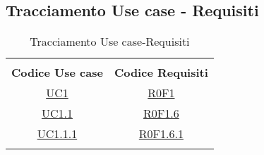 \subsection{Tracciamento Use case - Requisiti}
\normalsize
\begin{longtable}{|c|c|}
	\hline\\
	\rowcolor{dosblue}
	\textbf{Codice Use case} & \textbf{Codice Requisiti} \\
	\hline
	\endhead
	\hyperlink{UC1}{UC1} & \hyperlink{R0F1}{R0F1}\\
	\hline
	\hyperlink{UC1.1}{UC1.1} & \hyperlink{R0F1.6}{R0F1.6}\\
	\hline
	\hyperlink{UC1.1.1}{UC1.1.1} & \hyperlink{R0F1.6.1}{R0F1.6.1}\\
	\hline
	\caption[Tracciamento Use case-Requisiti]{Tracciamento Use case-Requisiti}
	\label{tabella:requi-usecase}
\end{longtable}
\clearpage



